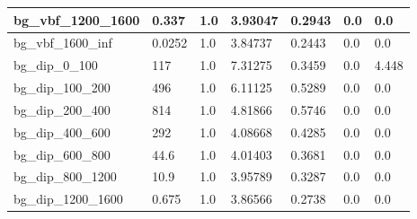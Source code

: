 \documentclass[a4paper, 10pt]{article}
\begin{document}
\begin{table}[H]
\begin{center}
\begin{tabular}{|m{23.0mm}|m{23.0mm}|m{18.0mm}|m{19.0mm}|m{19.0mm}|m{19.0mm}|m{19.0mm}|}
      \hline
      {\cellcolor{white}         bg\_vbf\_1200\_1600}& {\cellcolor{white}         0.337}& {\cellcolor{white}         1.0}& {\cellcolor{white}         3.93047}& {\cellcolor{white}         0.2943}& {\cellcolor{green}         0.0}& {\cellcolor{green}         0.0}\\
      \hline
      {\cellcolor{white}         bg\_vbf\_1600\_inf}& {\cellcolor{white}         0.0252}& {\cellcolor{white}         1.0}& {\cellcolor{white}         3.84737}& {\cellcolor{white}         0.2443}& {\cellcolor{green}         0.0}& {\cellcolor{green}         0.0}\\
      \hline
      {\cellcolor{white}         bg\_dip\_0\_100}& {\cellcolor{white}         117}& {\cellcolor{white}         1.0}& {\cellcolor{white}         7.31275}& {\cellcolor{white}         0.3459}& {\cellcolor{green}         0.0}& {\cellcolor{green}         4.448}\\
      \hline
      {\cellcolor{white}         bg\_dip\_100\_200}& {\cellcolor{white}         496}& {\cellcolor{white}         1.0}& {\cellcolor{white}         6.11125}& {\cellcolor{white}         0.5289}& {\cellcolor{green}         0.0}& {\cellcolor{green}         0.0}\\
      \hline
      {\cellcolor{white}         bg\_dip\_200\_400}& {\cellcolor{white}         814}& {\cellcolor{white}         1.0}& {\cellcolor{white}         4.81866}& {\cellcolor{white}         0.5746}& {\cellcolor{green}         0.0}& {\cellcolor{green}         0.0}\\
      \hline
      {\cellcolor{white}         bg\_dip\_400\_600}& {\cellcolor{white}         292}& {\cellcolor{white}         1.0}& {\cellcolor{white}         4.08668}& {\cellcolor{white}         0.4285}& {\cellcolor{green}         0.0}& {\cellcolor{green}         0.0}\\
      \hline
      {\cellcolor{white}         bg\_dip\_600\_800}& {\cellcolor{white}         44.6}& {\cellcolor{white}         1.0}& {\cellcolor{white}         4.01403}& {\cellcolor{white}         0.3681}& {\cellcolor{green}         0.0}& {\cellcolor{green}         0.0}\\
      \hline
      {\cellcolor{white}         bg\_dip\_800\_1200}& {\cellcolor{white}         10.9}& {\cellcolor{white}         1.0}& {\cellcolor{white}         3.95789}& {\cellcolor{white}         0.3287}& {\cellcolor{green}         0.0}& {\cellcolor{green}         0.0}\\
      \hline
      {\cellcolor{white}         bg\_dip\_1200\_1600}& {\cellcolor{white}         0.675}& {\cellcolor{white}         1.0}& {\cellcolor{white}         3.86566}& {\cellcolor{white}         0.2738}& {\cellcolor{green}         0.0}& {\cellcolor{green}         0.0}\\

\end{tabular}
\end{center}
\end{table}
\end{document}
